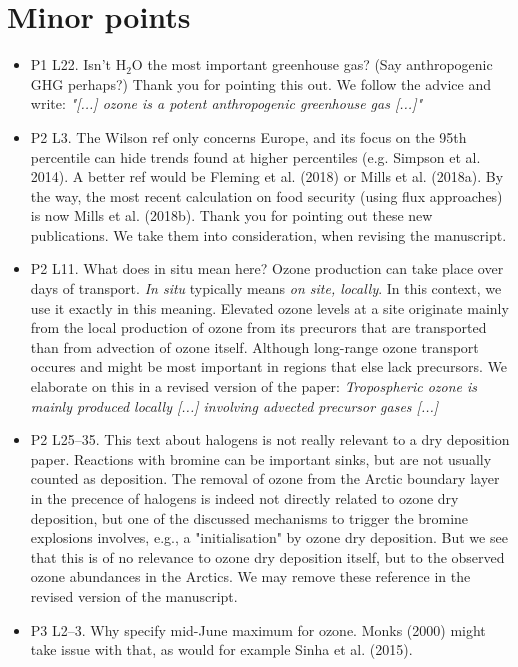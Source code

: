 \documentclass{scrartcl}
\begin{document}
\section{Minor points}
\begin{itemize}
\item {\color{blue}P1 L22. Isn’t $\mathrm{H_2O}$ the most important greenhouse gas? (Say anthropogenic
  GHG perhaps?)}
  Thank you for pointing this out. We follow the advice and write: \emph{"[...] ozone is a potent anthropogenic greenhouse gas [...]"}
\item {\color{blue}P2 L3. The Wilson ref only concerns Europe, and its focus on the 95th percentile can hide trends
  found at higher percentiles (e.g. Simpson et al. 2014). A better ref would be Fleming et al. (2018) or Mills et al. (2018a). By the way, the most recent calculation on food security (using flux approaches) is now Mills et al. (2018b).}
  Thank you for pointing out these new publications. We take them into consideration, when revising the manuscript.
\item {\color{blue}P2 L11. What does in situ mean here? Ozone production can take place over
  days of transport.}
  \emph{In situ} typically means \emph{on site, locally}. In this context, we use it exactly in this meaning. Elevated ozone levels at a site originate mainly from the local production of ozone from its precurors that are transported than from advection of ozone itself. Although long-range ozone transport occures and might be most important in regions that else lack precursors. We elaborate on this in a revised version of the paper: \emph{Tropospheric ozone is mainly produced locally [...] involving advected precursor gases [...]}
\item {\color{blue}P2 L25--35. This text about halogens is not really relevant to a dry deposition
paper. Reactions with bromine can be important sinks, but are not usually counted
as deposition.}
  The removal of ozone from the Arctic boundary layer in the precence of halogens is indeed not directly related to ozone dry deposition, but one of the discussed mechanisms to trigger the bromine explosions involves, e.g., a "initialisation" by ozone dry deposition. But we see that this is of no relevance to ozone dry deposition itself, but to the observed ozone abundances in the Arctics. We may remove these reference in the revised version of the manuscript.
  
\item {\color{blue}P3 L2--3. Why specify mid-June maximum for ozone. Monks (2000) might
  take issue with that, as would for example Sinha et al. (2015).}
  

\end{itemize}
\end{document}
